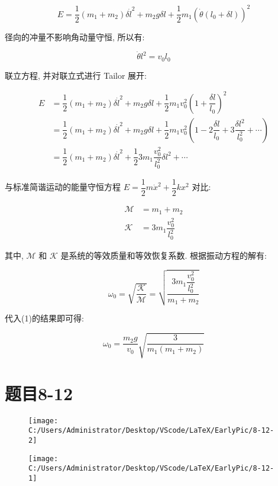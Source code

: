 \documentclass[12pt,a4paper]{article}
\begin{document}
		\begin{equation}
			E=\dfrac{1}{2}(m_1+m_2)\delta\dot{l}^2+m_2g\delta l+\dfrac{1}{2}m_1\left( \dot{\theta}\left( l_0+\delta l\right) \right) ^2
		\end{equation}
		
		径向的冲量不影响角动量守恒, 所以有:
		
		\begin{equation}
			\dot{\theta}l^2=v_0l_0
		\end{equation}
		
		联立方程, 并对联立式进行 Tailor 展开:
		
		\begin{align}
			E&=\dfrac{1}{2}\left( m_1+m_2\right)\delta\dot{l}^2+m_2g\delta l+\dfrac{1}{2}m_1v_0^2\left( 1+\dfrac{\delta l}{l_0}\right)^2 \nonumber
			\\
			&=\dfrac{1}{2}\left( m_1+m_2\right)\delta\dot{l}^2+m_2g\delta l+\dfrac{1}{2}m_1v_0^2\left( 1-2\dfrac{\delta l}{l_0}+3\dfrac{\delta l^2}{l_0^2}+\cdots\right) \nonumber
			\\
			&=\dfrac{1}{2}\left( m_1+m_2\right)\delta \dot{l}^2+\dfrac{1}{2}3m_1\dfrac{v_0^2}{l_0^2}\delta l^2+\cdots 
		\end{align}
		
		与标准简谐运动的能量守恒方程 $E=\dfrac{1}{2}m\dot{x}^2+\dfrac{1}{2}kx^2$ 对比:
		
		\begin{align}
			\mathcal{M}&=m_1+m_2
			\\
			\mathcal{K}&=3m_1\dfrac{v_0^2}{l_0^2}
		\end{align}
		
		其中, $\mathcal{M}$ 和 $\mathcal{K}$ 是系统的等效质量和等效恢复系数. 根据振动方程的解有:
		
		\begin{equation}
			\omega_0=\sqrt{\dfrac{\mathcal{K}}{\mathcal{M}}}=\sqrt{\dfrac{3m_1\dfrac{v_0^2}{l_0^2}}{m_1+m_2}}
		\end{equation}
		
		代入(1)的结果即可得:
		
		$$
		\omega_0=\dfrac{m_2g}{v_0}\sqrt{\dfrac{3}{m_1\left(m_1+m_2 \right) }}
		$$
		
		\section{题目8-12}
		
		\begin{figure}[H]
			\begin{minipage}{0.4\textwidth}
				\centering
				\texttt{[image: C:/Users/Administrator/Desktop/VScode/LaTeX/EarlyPic/8-12-2]}
				\caption*{}
			\end{minipage}
			\hfill
			\begin{minipage}{0.52\textwidth}
				\centering
				\texttt{[image: C:/Users/Administrator/Desktop/VScode/LaTeX/EarlyPic/8-12-1]}
				\caption*{}
			\end{minipage}
		\end{figure}
		
\end{document}
